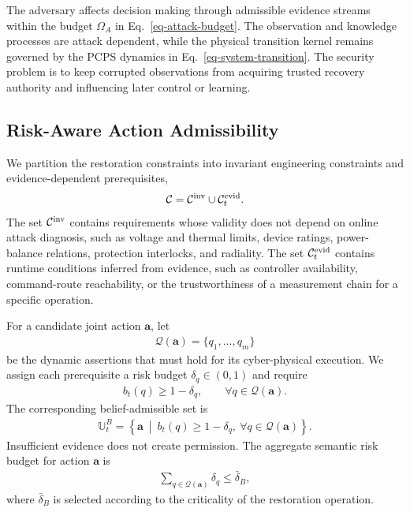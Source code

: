 The adversary affects decision making through admissible evidence streams within the budget $\Omega_A$ in Eq.~\ref{eq-attack-budget}. The observation and knowledge processes are attack dependent, while the physical transition kernel remains governed by the PCPS dynamics in Eq.~\ref{eq-system-transition}. The security problem is to keep corrupted observations from acquiring trusted recovery authority and influencing later control or learning.

\subsection{Risk-Aware Action Admissibility}
\label{subsec-risk-admissibility}
We partition the restoration constraints into invariant engineering constraints and evidence-dependent prerequisites,
\begin{align}
\label{eq-constraint-partition}
\mathcal{C}=\mathcal{C}^{\rm inv}\cup\mathcal{C}^{\rm evid}_t.
\end{align}
The set $\mathcal{C}^{\rm inv}$ contains requirements whose validity does not depend on online attack diagnosis, such as voltage and thermal limits, device ratings, power-balance relations, protection interlocks, and radiality. The set $\mathcal{C}^{\rm evid}_t$ contains runtime conditions inferred from evidence, such as controller availability, command-route reachability, or the trustworthiness of a measurement chain for a specific operation.

For a candidate joint action $\mathbf{a}$, let
\begin{align}
\mathcal{Q}(\mathbf{a})=\{q_1,\ldots,q_m\}
\end{align}
be the dynamic assertions that must hold for its cyber-physical execution. We assign each prerequisite a risk budget $\delta_q\in(0,1)$ and require
\begin{align}
\label{eq-belief-prerequisite}
b_t(q)\ge 1-\delta_q,
\qquad \forall q\in\mathcal{Q}(\mathbf{a}).
\end{align}
The corresponding belief-admissible set is
\begin{align}
\label{eq-belief-admissible-set}
\mathbb{U}^{B}_t=
\left\{\mathbf{a}\ \middle|\
 b_t(q)\ge1-\delta_q,
\ \forall q\in\mathcal{Q}(\mathbf{a})
\right\}.
\end{align}
Insufficient evidence does not create permission. The aggregate semantic risk budget for action $\mathbf{a}$ is
\begin{align}
\label{eq-semantic-risk-budget}
\sum_{q\in\mathcal{Q}(\mathbf{a})}\delta_q\le\bar{\delta}_{B},
\end{align}
where $\bar{\delta}_{B}$ is selected according to the criticality of the restoration operation.

